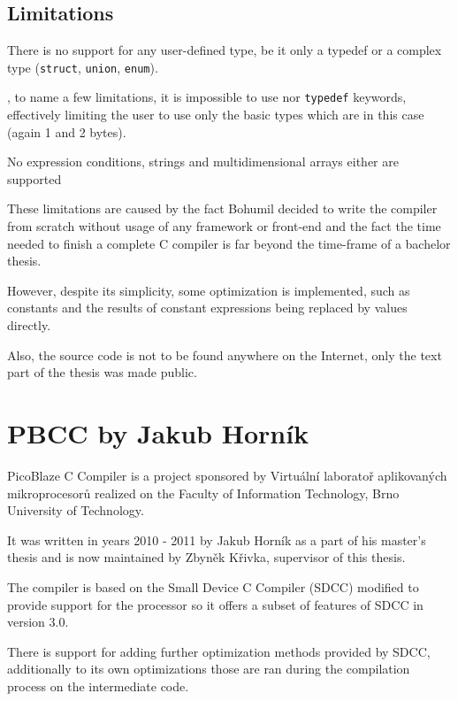         \subsection{Limitations}

        There is no support for any user-defined type, be it only a typedef or a complex type (\texttt{struct}, \texttt{union}, \texttt{enum}).

    ,
    to name a few limitations, it is impossible to use nor \texttt{typedef} keywords, effectively limiting the user to use only the basic types which are in this case  (again 1 and 2 bytes).

    No expression conditions, strings and multidimensional arrays either are supported

    These limitations are caused by the fact Bohumil decided to write the compiler
    from scratch without usage of any framework or front-end and the fact the time needed to finish a complete C compiler is far beyond the time-frame of a bachelor thesis.

    However, despite its simplicity, some optimization is implemented, 
    such as constants and the results of constant expressions being replaced by values directly.

    Also, the source code is not to be found anywhere on the Internet, only the text part of the thesis was made public.


    \section{PBCC by Jakub Horník}\label{prev_pbcc}


    PicoBlaze C Compiler is a project sponsored by Virtuální laboratoř aplikovaných mikroprocesorů 
    realized on the Faculty of Information Technology, Brno University of Technology.

    It was written in years 2010 - 2011 by Jakub Horník as a part of his master's thesis and is now maintained by Zbyněk Křivka, supervisor of this thesis.

    The compiler is based on the Small Device C Compiler (SDCC) modified to provide support for the processor so it offers a subset of features of SDCC in version 3.0.

    There is support for adding further optimization methods provided by SDCC, additionally to its own optimizations those are ran during the compilation process on the intermediate code.

